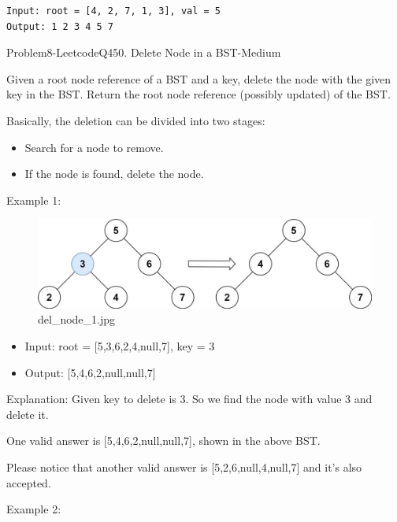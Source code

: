 \documentclass[11pt]{article}
\providecommand{\tightlist}{%
      \setlength{\itemsep}{0pt}\setlength{\parskip}{0pt}}
\begin{document}
    \begin{Verbatim}[commandchars=\\\{\}]
Input: root = [4, 2, 7, 1, 3], val = 5
Output: 1 2 3 4 5 7
    \end{Verbatim}

    Problem8-LeetcodeQ450. Delete Node in a BST-Medium

Given a root node reference of a BST and a key, delete the node with the
given key in the BST. Return the root node reference (possibly updated)
of the BST.

Basically, the deletion can be divided into two stages:

\begin{itemize}
\tightlist
\item
  Search for a node to remove.
\item
  If the node is found, delete the node.
\end{itemize}

Example 1:

\begin{figure}
\centering
\includegraphics{fe13dfa1-1969-4a02-ba9e-ab0d0e828532.jpg}
\caption{del\_node\_1.jpg}
\end{figure}

\begin{itemize}
\tightlist
\item
  Input: root = {[}5,3,6,2,4,null,7{]}, key = 3
\item
  Output: {[}5,4,6,2,null,null,7{]}
\end{itemize}

Explanation: Given key to delete is 3. So we find the node with value 3
and delete it.

One valid answer is {[}5,4,6,2,null,null,7{]}, shown in the above BST.

Please notice that another valid answer is {[}5,2,6,null,4,null,7{]} and
it's also accepted.

Example 2:
\end{document}
